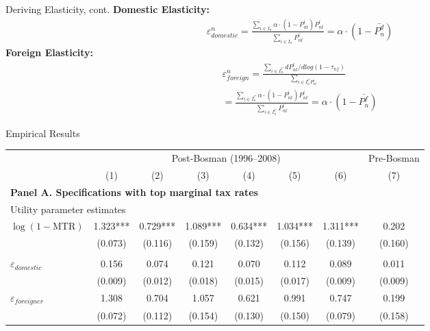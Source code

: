 \documentclass[aspectratio=169,professionalfonts]{beamer}
\newcommand{\hl}[1]{\textbf{\textcolor{UGARed}{#1}}}
\newcommand{\hl}[1]{\textbf{\color{UGARed}{#1}}}
\begin{document}
\begin{frame}{Deriving Elasticity, cont.}
  \hl{Domestic Elasticity:}
  \begin{gather*}
    \varepsilon_{domestic}^n = \frac{\sum_{i\in I_n}\alpha\cdot(1-P_{nt}^i)P_{nt}^i}{\sum_{i\in I_n}P_{nt}^i} = \alpha\cdot(1-\bar{P_n^d})
  \end{gather*}
  \hl{Foreign Elasticity:}
  \begin{gather*}
    \varepsilon_{foreign}^n = \frac{\sum_{i\in I_n^C}dP_{nt}^i/dlog(1-\tau_{nf})}{\sum_{i\in I_n^CP_{nt}^i}} \\
    = \frac{\sum_{i\in I_n^C}\alpha\cdot(1-P_{nt}^i)P_{nt}^i}{\sum_{i\in I_n^C}P_{nt}^i} = \alpha\cdot(1-\bar{P_n^f})
  \end{gather*}
\end{frame}

\begin{frame}{Empirical Results}
  \scriptsize
  \centering

  \begin{tabular}{lccccccc}
  \toprule
  & \multicolumn{6}{c}{Post-Bosman (1996--2008)} & Pre-Bosman \\
  & (1) & (2) & (3) & (4) & (5) & (6) & (7) \\
  \midrule
  \multicolumn{8}{l}{\textbf{Panel A. Specifications with top marginal tax rates}} \\

  \multicolumn{8}{l}{Utility parameter estimates} \\
  $\log(1-\mathrm{MTR})$
  & 1.323*** & 0.729*** & 1.089*** & 0.634*** & 1.034*** & 1.311*** & 0.202 \\
  & (0.073) & (0.116) & (0.159) & (0.132) & (0.156) & (0.139) & (0.160) \\

  \addlinespace
  \multicolumn{8}{l}{Implied elasticities} \\
  $\varepsilon_{domestic}$
  & 0.156 & 0.074 & 0.121 & 0.070 & 0.112 & 0.089 & 0.011 \\
  & (0.009) & (0.012) & (0.018) & (0.015) & (0.017) & (0.009) & (0.009) \\

  $\varepsilon_{foreigner}$
  & 1.308 & 0.704 & 1.057 & 0.621 & 0.991 & 0.747 & 0.199 \\
  & (0.072) & (0.112) & (0.154) & (0.130) & (0.150) & (0.079) & (0.158) \\
  \bottomrule
  \end{tabular}

\end{frame}
\end{document}
